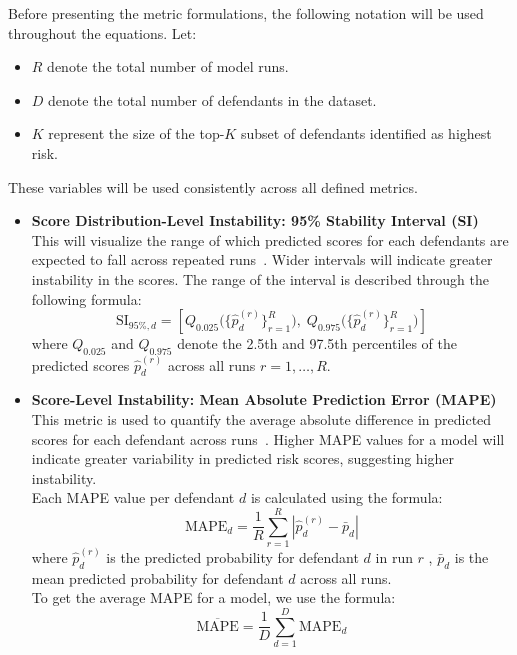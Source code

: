 \documentclass[12pt]{article}
\begin{document}
Before presenting the metric formulations, the following notation will be used throughout the equations. Let: 
\begin{itemize}
  \item $ R $ denote the total number of model runs.
  \item $ D $ denote the total number of defendants in the dataset.
  \item $ K $ represent the size of the top-$K$ subset of defendants identified as highest risk.
\end{itemize}
\tab These variables will be used consistently across all defined metrics.

\begin{itemize}
  \item \textbf{Score Distribution-Level Instability: 95\% Stability Interval (SI)}\\
    \tab This will visualize the range of which predicted scores for each defendants are expected to fall across repeated runs~\cite{riley2023stability}. Wider intervals will indicate greater instability in the scores. The range of the interval is described through the following formula: \\
    \[
    \text{SI}_{95\%,d} =
    \left[
    Q_{0.025}\big(\{\hat{p}_d^{(r)}\}_{r=1}^{R}\big),
    \;
    Q_{0.975}\big(\{\hat{p}_d^{(r)}\}_{r=1}^{R}\big)
    \right]
    \] 
    where $ Q_{0.025} $ and $ Q_{0.975} $ denote the 2.5th and 97.5th percentiles of the predicted scores $ \hat{p}_d^{(r)} $ across all runs $ r = 1, \dots, R $.

  \item \textbf{Score-Level Instability: Mean Absolute Prediction Error (MAPE)}\\
    \tab This metric is used to quantify the average absolute difference in predicted scores for each defendant across runs~\cite{riley2023stability}. Higher MAPE values for a model will indicate greater variability in predicted risk scores, suggesting higher instability.\\

    Each MAPE value per defendant $ d $ is calculated using the formula:
    \[ \text{MAPE}_d=\frac{1}{R}\sum_{r=1}^{R}|\hat{p}_{d}^{(r)}-\bar{p}_d| \]
    where $ \hat{p}_d^{(r)} $ is the predicted probability for  defendant $ d $ in run $ r $ , $ \bar{p}_d $ is the mean predicted probability for  defendant $ d $ across all runs. \\

    To get the average MAPE for a model, we use the formula:
    \[ \overline{\text{MAPE}}=\frac{1}{D}\sum_{d=1}^{D}\text{MAPE}_d \]


\end{itemize}
\end{document}
